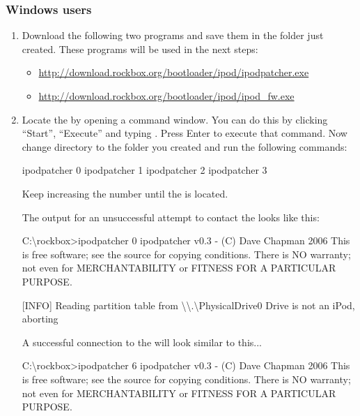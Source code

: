 \subsubsection{Windows users}
\begin{enumerate}
  \item Download the following two programs and save them in the folder just
    created. These programs will be used in the next steps:
    \begin{itemize}
      \item \url{http://download.rockbox.org/bootloader/ipod/ipodpatcher.exe}
      \item \url{http://download.rockbox.org/bootloader/ipod/ipod_fw.exe}
    \end{itemize}
  \item Locate the \dap{} by opening a command window. You can do this by
    clicking ``Start'', ``Execute'' and typing . Press Enter to
    execute that command. Now change directory to the
    folder you created and run the following commands:
    \begin{code}
    ipodpatcher 0
    ipodpatcher 1
    ipodpatcher 2
    ipodpatcher 3
    \end{code}
    Keep increasing the number until the \dap{} is located.

    The output for an unsuccessful attempt to contact the \dap{} looks like
    this:
    \begin{code}
    C:\textbackslash{}rockbox>ipodpatcher 0
    ipodpatcher v0.3 - (C) Dave Chapman 2006
    This is free software; see the source for copying conditions.  There is NO
    warranty; not even for MERCHANTABILITY or FITNESS FOR A PARTICULAR PURPOSE.

    [INFO] Reading partition table from \textbackslash\textbackslash{}.\textbackslash{}PhysicalDrive0
    Drive is not an iPod, aborting
    \end{code}
    
    A successful connection to the \dap{} will look similar to this...
    \begin{code}
    C:\textbackslash{}rockbox>ipodpatcher 6
    ipodpatcher v0.3 - (C) Dave Chapman 2006
    This is free software; see the source for copying conditions.  There is NO
    warranty; not even for MERCHANTABILITY or FITNESS FOR A PARTICULAR PURPOSE.


\end{code}
\end{enumerate}
